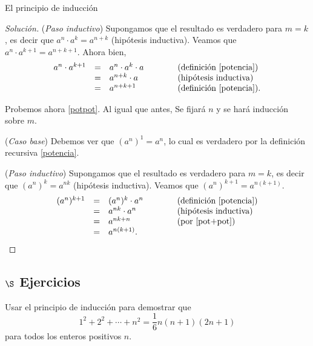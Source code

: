 \begin{section}{El principio de inducción}
\begin{proof}[Solución]
    \noindent (\textit{Paso  inductivo}) Supongamos que el resultado es verdadero para $m=k$, es decir que $a^{n} \cdot a^k = a^{n+k}$ (hipótesis inductiva). Veamos que  $a^{n} \cdot a^{k+1} = a^{n+k+1}$. Ahora bien, 
    \begin{equation*}
        \begin{matrix*}[l]
            a^{n} \cdot a^{k+1} &=& a^{n} \cdot a^{k} \cdot a &\qquad  &\text{(definición \eqref{potencia})} \\
            &=& a^{n+k} \cdot a &\qquad &\text{(hipótesis inductiva)} \\
            &=& a^{n+k+1} &\qquad  &\text{(definición \eqref{potencia})}. 
        \end{matrix*}
    \end{equation*}
    
    Probemos ahora \ref{potpot}. Al igual que antes, Se fijará $n$ y se hará inducción sobre $m$.
    
    \noindent(\textit{Caso  base}) Debemos ver que $(a^n)^1 = a^n$, lo cual es verdadero por la definición recursiva \eqref{potencia}. 
    
    
    \noindent (\textit{Paso  inductivo}) Supongamos que el resultado es verdadero para $m=k$, es decir que  $(a^n)^k = a^{nk}$ (hipótesis inductiva). Veamos que  $(a^n)^{k+1} = a^{n(k+1)}$. 
    \begin{equation*}
        \begin{matrix*}[l]
        (a^n)^{k+1} &=& (a^n)^{k} \cdot a^n &\qquad  &\text{(definición \eqref{potencia})} \\
        &=& a^{nk} \cdot a^n &\qquad &\text{(hipótesis inductiva)} \\
        &=& a^{nk+n} &\qquad  &\text{(por \ref{pot+pot})}\\
        &=& a^{n(k+1)}. &\qquad  &
    \end{matrix*}
\end{equation*}
\end{proof}

\subsection*{$\S$ Ejercicios}

\begin{enumex}
\item Usar el principio de inducción para demostrar que
$$
1^2+2^2+\cdots +n^2 = \frac16 n(n+1)(2n +1)
$$
para todos los enteros positivos $n$.


\end{enumex}
\end{section}
